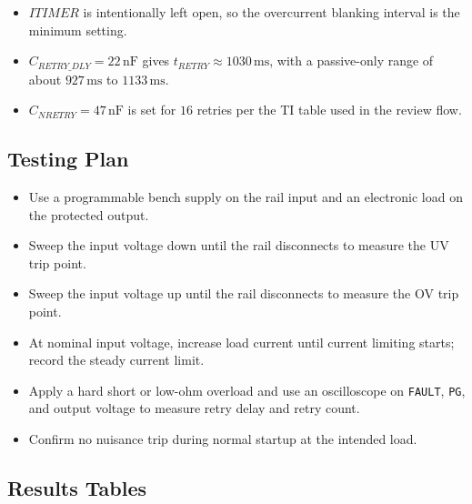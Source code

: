\documentclass[11pt,a4paper]{article}
\begin{document}
\begin{itemize}
\item $ITIMER$ is intentionally left open, so the overcurrent blanking interval is the minimum setting.
\item $C_{RETRY\_DLY} = 22\,\mathrm{nF}$ gives $t_{RETRY} \approx 1030\,\mathrm{ms}$, with a passive-only range of about $927\,\mathrm{ms}$ to $1133\,\mathrm{ms}$.
\item $C_{NRETRY} = 47\,\mathrm{nF}$ is set for $16$ retries per the TI table used in the review flow.
\end{itemize}

\subsection{Testing Plan}

\begin{itemize}
\item Use a programmable bench supply on the rail input and an electronic load on the protected output.
\item Sweep the input voltage down until the rail disconnects to measure the UV trip point.
\item Sweep the input voltage up until the rail disconnects to measure the OV trip point.
\item At nominal input voltage, increase load current until current limiting starts; record the steady current limit.
\item Apply a hard short or low-ohm overload and use an oscilloscope on \texttt{FAULT}, \texttt{PG}, and output voltage to measure retry delay and retry count.
\item Confirm no nuisance trip during normal startup at the intended load.
\end{itemize}

\subsection{Results Tables}
\end{document}
